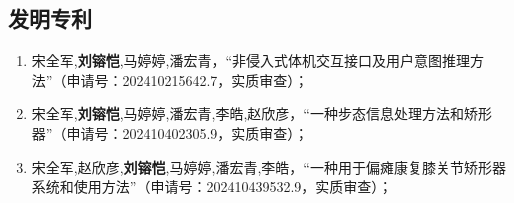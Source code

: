 \begin{publications}
\section*{发明专利}
\begin{enumerate}
\item 宋全军,\textbf{刘镕恺},马婷婷,潘宏青，“非侵入式体机交互接口及用户意图推理方法”（申请号：202410215642.7，实质审查）；
\item 宋全军,\textbf{刘镕恺},马婷婷,潘宏青,李皓,赵欣彦，“一种步态信息处理方法和矫形器”（申请号：202410402305.9，实质审查）；
\item 宋全军,赵欣彦,\textbf{刘镕恺},马婷婷,潘宏青,李皓，“一种用于偏瘫康复膝关节矫形器系统和使用方法”（申请号：202410439532.9，实质审查）；
\end{enumerate}


\end{publications}
